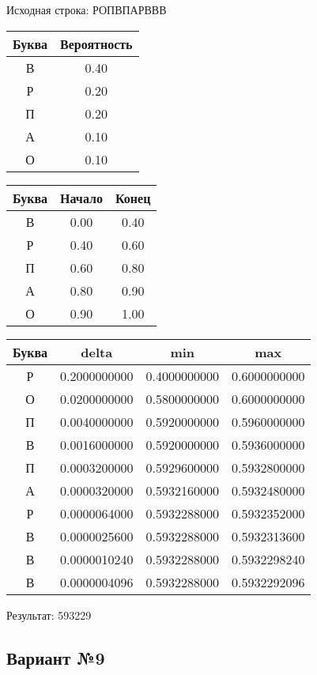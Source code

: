 \documentclass[a4paper, 12pt]{article}
\begin{document}
Исходная строка: РОПВПАРВВВ\
\begin{center}
 \begin{tabular}{ |c|c| } 
  \hline
     Буква & Вероятность \\ \hline
В & 0.40\\\hline
Р & 0.20\\\hline
П & 0.20\\\hline
А & 0.10\\\hline
О & 0.10
\\ \hline \end{tabular}
\end{center}
\begin{center}
 \begin{tabular}{ |c|c|c| } 
  \hline
     Буква & Начало & Конец \\ \hline
В & 0.00 & 0.40\\\hline
Р & 0.40 & 0.60\\\hline
П & 0.60 & 0.80\\\hline
А & 0.80 & 0.90\\\hline
О & 0.90 & 1.00
\\ \hline \end{tabular}
\end{center}
\begin{center}
 \begin{tabular}{ |c|c|c|c| } 
  \hline
     Буква & delta & min & max \\ \hline
Р & 0.2000000000 & 0.4000000000 & 0.6000000000\\\hline
О & 0.0200000000 & 0.5800000000 & 0.6000000000\\\hline
П & 0.0040000000 & 0.5920000000 & 0.5960000000\\\hline
В & 0.0016000000 & 0.5920000000 & 0.5936000000\\\hline
П & 0.0003200000 & 0.5929600000 & 0.5932800000\\\hline
А & 0.0000320000 & 0.5932160000 & 0.5932480000\\\hline
Р & 0.0000064000 & 0.5932288000 & 0.5932352000\\\hline
В & 0.0000025600 & 0.5932288000 & 0.5932313600\\\hline
В & 0.0000010240 & 0.5932288000 & 0.5932298240\\\hline
В & 0.0000004096 & 0.5932288000 & 0.5932292096
\\ \hline \end{tabular}
\end{center}
Результат: 593229
\pagebreak
\subsection{Вариант №9}
\end{document}
